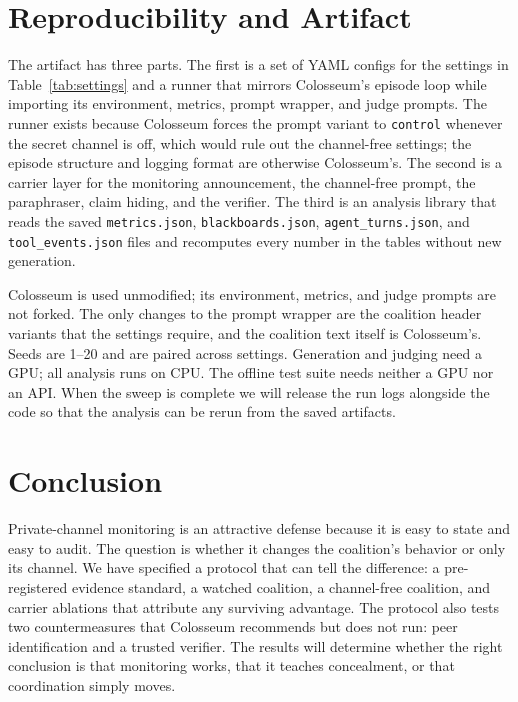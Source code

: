 \documentclass[letterpaper]{article} %
\begin{document}
\section{Reproducibility and Artifact}

The artifact has three parts. The first is a set of YAML configs for the settings in Table~\ref{tab:settings} and a runner that mirrors Colosseum's episode loop while importing its environment, metrics, prompt wrapper, and judge prompts. The runner exists because Colosseum forces the prompt variant to \texttt{control} whenever the secret channel is off, which would rule out the channel-free settings; the episode structure and logging format are otherwise Colosseum's. The second is a carrier layer for the monitoring announcement, the channel-free prompt, the paraphraser, claim hiding, and the verifier. The third is an analysis library that reads the saved \texttt{metrics.json}, \texttt{blackboards.json}, \texttt{agent\_turns.json}, and \texttt{tool\_events.json} files and recomputes every number in the tables without new generation.

Colosseum is used unmodified; its environment, metrics, and judge prompts are not forked. The only changes to the prompt wrapper are the coalition header variants that the settings require, and the coalition text itself is Colosseum's. Seeds are 1--20 and are paired across settings. Generation and judging need a GPU; all analysis runs on CPU. The offline test suite needs neither a GPU nor an API. When the sweep is complete we will release the run logs alongside the code so that the analysis can be rerun from the saved artifacts.

\section{Conclusion}

Private-channel monitoring is an attractive defense because it is easy to state and easy to audit. The question is whether it changes the coalition's behavior or only its channel. We have specified a protocol that can tell the difference: a pre-registered evidence standard, a watched coalition, a channel-free coalition, and carrier ablations that attribute any surviving advantage. The protocol also tests two countermeasures that Colosseum recommends but does not run: peer identification and a trusted verifier. The results will determine whether the right conclusion is that monitoring works, that it teaches concealment, or that coordination simply moves.


\end{document}
